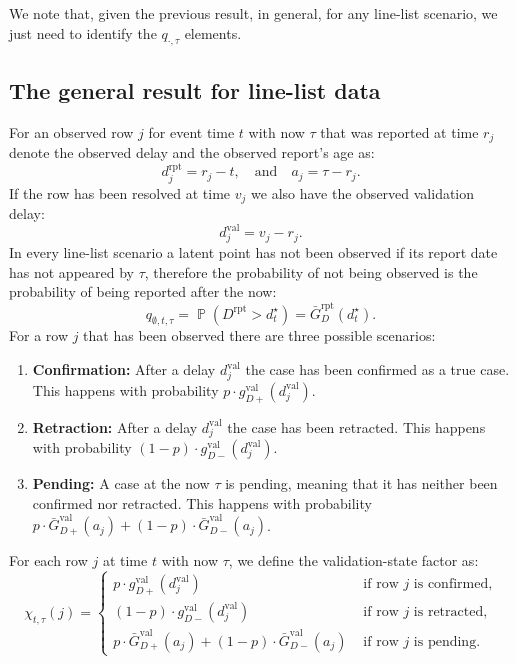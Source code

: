 \documentclass{article}
\theoremstyle{definition}
\theoremstyle{remark}
\newcommand{\Prb}{\operatorname{\mathbb{P}}}
\begin{document}
We note that, given the previous result, in general, for any line-list scenario, we just need to identify the $q_{\cdot,\tau}$ elements. 

\subsection{The general result for line-list data}

For an observed row $j$ for event time $t$ with now $\tau$ that was reported at time $r_j$ denote the observed delay and the observed report's age as:
\begin{equation}
    d_j^{\text{rpt}} = r_j - t, \quad \text{and} \quad a_j = \tau - r_j.
\end{equation}
If the row has been resolved at time $v_j$ we also have the observed validation delay:
\begin{equation}
d_j^{\text{val}} = v_j - r_j.
\end{equation}
In every line-list scenario a latent point has not been observed if its report date has not appeared by $\tau$, therefore the probability of not being observed is the probability of being reported after the now:
\begin{equation}
    q_{\emptyset, t, \tau} 
    = \Prb(D^{\text{rpt}} > d_t^{\star}) 
    = \bar{G}_D^{\text{rpt}}(d_t^{\star}).
\end{equation}
For a row $j$ that has been observed there are three possible scenarios:
\begin{enumerate}
    \item \textbf{Confirmation:} After a delay $d_j^{\text{val}}$ the case has been confirmed as a true case. This happens with probability $p \cdot g_{D+}^{\text{val}}(d_j^{\text{val}})$.
    \item \textbf{Retraction:} After a delay $d_j^{\text{val}}$ the case has been retracted. This happens with probability $(1 -p) \cdot g_{D-}^{\text{val}}(d_j^{\text{val}})$.
    \item \textbf{Pending:} A case at the now $\tau$ is pending, meaning that it has neither been confirmed nor retracted. This happens with probability $p \cdot \bar{G}_{D+}^{\text{val}}(a_j) + (1 - p) \cdot \bar{G}_{D-}^{\text{val}}(a_j)$.
\end{enumerate}
For each row $j$ at time $t$ with now $\tau$, we define the validation-state factor as:
\begin{equation}\label{chilinelist}
    \chi_{t,\tau}(j) = \begin{cases}
        p \cdot g_{D+}^{\text{val}}(d_j^{\text{val}}) & \text{ if row } j \text{ is confirmed,} \\
        (1 -p) \cdot g_{D-}^{\text{val}}(d_j^{\text{val}}) & \text{ if row } j \text{ is retracted,} \\
        p \cdot \bar{G}_{D+}^{\text{val}}(a_j) + (1 - p) \cdot \bar{G}_{D-}^{\text{val}}(a_j) & \text{ if row } j \text{ is pending.} 
    \end{cases}
\end{equation}
\end{document}
